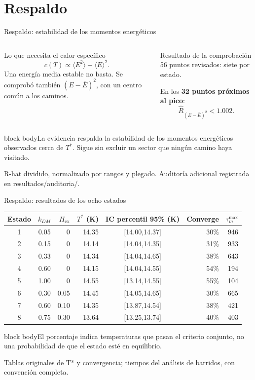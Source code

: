 \documentclass[aspectratio=169,10pt]{beamer}
\newcommand{\D}{k_{DM}}
\newcommand{\Hex}{H_{\mathrm{ex}}}
\newcommand{\Rhat}{\widehat R}
\newcommand{\idea}[1]{\vspace{2pt}\begin{beamercolorbox}[rounded=true,sep=5pt,wd=\linewidth]{block body}\small #1\end{beamercolorbox}}
\newcommand{\fuente}[1]{{\fontsize{6.5}{8}\selectfont\color{black!60}#1\par}}
\begin{document}
\section{Respaldo}
\begin{frame}{Respaldo: estabilidad de los momentos energéticos}
\begin{columns}[T,onlytextwidth]
\begin{block}{Lo que necesita el calor específico}
\[
c(T)\propto\langle E^2\rangle-\langle E\rangle^2.
\]
\small Una energía media estable no basta. Se comprobó también $(E-\bar E)^2$, con un centro común a los caminos.
\end{block}
\begin{block}{Resultado de la comprobación}
\small 56 puntos revisados: siete por estado.

\medskip
En los \textbf{32 puntos próximos al pico}:
\[
\Rhat_{(E-\bar E)^2}<1.002.
\]
\end{block}
\end{columns}
\idea{La evidencia respalda la estabilidad de los momentos energéticos observados cerca de $T^*$. Sigue sin excluir un sector que ningún camino haya visitado.}
\fuente{R-hat dividido, normalizado por rangos y plegado. Auditoría adicional registrada en resultados/auditoria/.}
\end{frame}
\begin{frame}{Respaldo: resultados de los ocho estados}
\small\renewcommand{\arraystretch}{1.13}
\begin{tabular}{crrrcrr}
\toprule
Estado & $\D$ & $\Hex$ & $T^*$ (K) & IC percentil 95\% (K) & Converge & $\tau_m^{\max}$\\\midrule
1&0.05&0&14.35&[14.00,14.37]&30\%&946\\
2&0.15&0&14.14&[14.04,14.35]&31\%&933\\
3&0.33&0&14.34&[14.04,14.65]&38\%&643\\
4&0.60&0&14.15&[14.04,14.55]&54\%&194\\
5&1.00&0&14.55&[13.14,14.55]&55\%&104\\
6&0.30&0.05&14.45&[14.05,14.65]&30\%&665\\
7&0.60&0.10&14.35&[13.87,14.54]&38\%&421\\
8&0.75&0.30&13.64&[13.25,13.74]&40\%&403\\\bottomrule
\end{tabular}
\idea{El porcentaje indica temperaturas que pasan el criterio conjunto, no una probabilidad de que el estado esté en equilibrio.}
\fuente{Tablas originales de T* y convergencia; tiempos del análisis de barridos, con convención completa.}
\end{frame}
\end{document}

